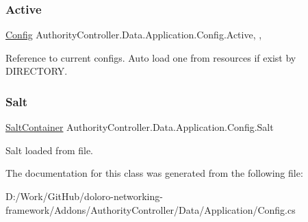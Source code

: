 \subsubsection{\texorpdfstring{Active}{Active}}
{\footnotesize\ttfamily \mbox{\hyperlink{class_authority_controller_1_1_data_1_1_application_1_1_config}{Config}} Authority\+Controller.\+Data.\+Application.\+Config.\+Active\hspace{0.3cm}{\ttfamily [static]}, {\ttfamily [get]}, {\ttfamily [set]}}



Reference to current configs. Auto load one from resources if exist by D\+I\+R\+E\+C\+T\+O\+RY. 

\mbox{\label{class_authority_controller_1_1_data_1_1_application_1_1_config_ac91189185d3ab6bf689bfaf37f83d9c1}} 
\subsubsection{\texorpdfstring{Salt}{Salt}}
{\footnotesize\ttfamily \mbox{\hyperlink{class_authority_controller_1_1_data_1_1_application_1_1_salt_container}{Salt\+Container}} Authority\+Controller.\+Data.\+Application.\+Config.\+Salt\hspace{0.3cm}{\ttfamily [get]}}



Salt loaded from file. 



The documentation for this class was generated from the following file\+:\begin{DoxyCompactItemize}
\item 
D\+:/\+Work/\+Git\+Hub/doloro-\/networking-\/framework/\+Addons/\+Authority\+Controller/\+Data/\+Application/Config.\+cs\end{DoxyCompactItemize}
